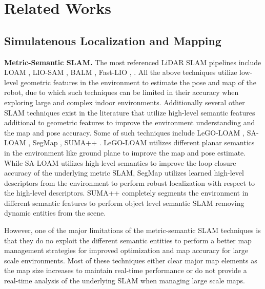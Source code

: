 \section{Related Works}
\label{sec:related_works}


\subsection{Simulatenous Localization and Mapping}

\textbf{Metric-Semantic SLAM.} The most referenced LiDAR SLAM pipelines include LOAM \cite{loam}, LIO-SAM \cite{lio_sam}, BALM \cite{BALM}, Fast-LIO \cite{fast_lio}, \cite{fast_lio2}. All the above techniques utilize low-level geometric features in the environment to estimate the pose and map of the robot, due to which such techniques can be limited in their accuracy when exploring large and complex indoor environments. Additionally several other SLAM techniques exist in the literature that utilize high-level semantic features additional to geometric features to improve the environment understanding and the map and pose accuracy. Some of such techniques include LeGO-LOAM \cite{lego-loam}, SA-LOAM \cite{sa-loam}, SegMap \cite{segmap}, SUMA++ \cite{suma}. LeGO-LOAM \cite{lego-loam} utilizes different planar semantics in the environment like ground plane to improve the map and pose estimate. While SA-LOAM \cite{sa-loam} utilizes high-level semantics to improve the loop closure accuracy of the underlying metric SLAM, SegMap \cite{segmap} utilizes learned high-level descriptors from the environment to perform robust localization with respect to the high-level descriptors. SUMA++ \cite{suma} completely segments the environment in different semantic features to perform object level semantic SLAM removing dynamic entities from the scene. 

However, one of the major limitations of the metric-semantic SLAM techniques is that they do no exploit the different semantic entities to perform a better map management strategies for improved optimization and map accuracy for large scale environments. Most of these techniques either clear major map elements as the map size increases to maintain real-time performance or do not provide a real-time analysis of the underlying SLAM when managing large scale maps.    

